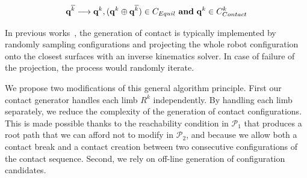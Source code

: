 \documentclass[journal]{IEEEtran}
\begin{document}
\begin{equation}
\label{eq:contact_gen}
	\mathbf{q}^{\overline{k}}  \longrightarrow \mathbf{q}^k, (\mathbf{q}^{k} \oplus \mathbf{q}^{\overline{k}}) \in  C_{Equil} \textrm{ \textbf{and}}\ \mathbf{q}^k \in  C_{Contact}^k 
\end{equation}

In previous works~\cite{DBLP:conf/iser/EscandeKMG08,Bouyarmane2009}, the generation of contact is typically implemented by randomly sampling configurations and projecting the whole robot configuration onto the closest surfaces with an inverse kinematics solver.
In case of failure of the projection, the process would randomly iterate.


We propose two modifications of this general algorithm principle.
First our contact generator handles each limb $R^k$ independently.
By handling each limb separately, we reduce the complexity of the generation of contact configurations.
This is made possible thanks to the reachability condition in $\mathcal{P}_1$ that produces a root path that we can afford not to modify in $\mathcal{P}_2$, and because we allow both a contact break and a contact creation between two consecutive configurations of the contact sequence.
Second, we rely on off-line generation of configuration candidates.



\end{document}
